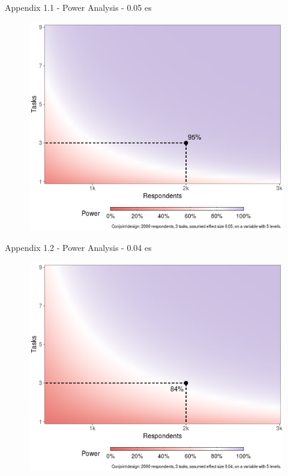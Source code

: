 \documentclass[10pt, aspectratio=169]{beamer}
\begin{document}
\begin{frame}
    \centering
    \vspace*{2em}
    \printbibliography
\end{frame}

\begin{frame}{Appendix 1.1 - Power Analysis - 0.05 es}
    \begin{figure}
        \centering
        \includegraphics[width=0.6\linewidth]{images/pa_3task.png}
        \label{fig:appendix1}
    \end{figure}
\end{frame}

\begin{frame}{Appendix 1.2 - Power Analysis - 0.04 es}
    \begin{figure}
        \centering
        \includegraphics[width=0.6\linewidth]{images/pa_3task_0.4effect.png}
        \label{fig:appendix2}
    \end{figure}    
\end{frame}
\end{document}
